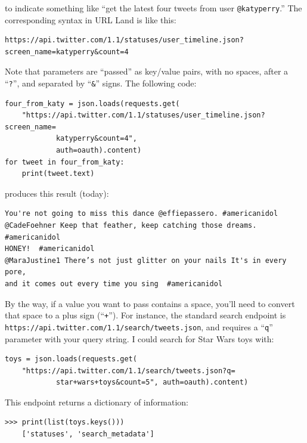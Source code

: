 to indicate something like ``get the latest four tweets from user
\texttt{@katyperry}.'' The corresponding syntax in URL Land is like this:

\begin{Verbatim}[fontsize=\footnotesize,samepage=true,frame=lines]
https://api.twitter.com/1.1/statuses/user_timeline.json?screen_name=katyperry&count=4
\end{Verbatim}

Note that parameters are ``passed'' as key/value pairs, with no spaces, after a
``\texttt{?}'', and separated by ``\texttt{\&}'' signs. The following code:

\begin{Verbatim}[fontsize=\small,samepage=true,frame=single]
four_from_katy = json.loads(requests.get(
    "https://api.twitter.com/1.1/statuses/user_timeline.json?screen_name=
            katyperry&count=4",
            auth=oauth).content)
for tweet in four_from_katy:
    print(tweet.text)
\end{Verbatim}
\normalsize

produces this result (today):

\begin{Verbatim}[fontsize=\small,samepage=true,frame=none]
You're not going to miss this dance @effiepassero. #americanidol
@CadeFoehner Keep that feather, keep catching those dreams. #americanidol
HONEY!  #americanidol
@MaraJustine1 There’s not just glitter on your nails It's in every pore,
and it comes out every time you sing  #americanidol
\end{Verbatim}

By the way, if a value you want to pass contains a space, you'll need to
convert that space to a plus sign (``\texttt{+}''). For instance, the standard
search endpoint is \texttt{https://api.twitter.com/1.1/search/tweets.json},
and requires a ``\texttt{q}'' parameter with your query string. I could search
for Star Wars toys with:

\small
\begin{Verbatim}[fontsize=\small,samepage=true,frame=single]
toys = json.loads(requests.get(
    "https://api.twitter.com/1.1/search/tweets.json?q=
            star+wars+toys&count=5", auth=oauth).content)
\end{Verbatim}
\normalsize

This endpoint returns a dictionary of information:

\begin{Verbatim}[fontsize=\small,samepage=true,frame=single]
>>> print(list(toys.keys()))
    ['statuses', 'search_metadata']
\end{Verbatim}

